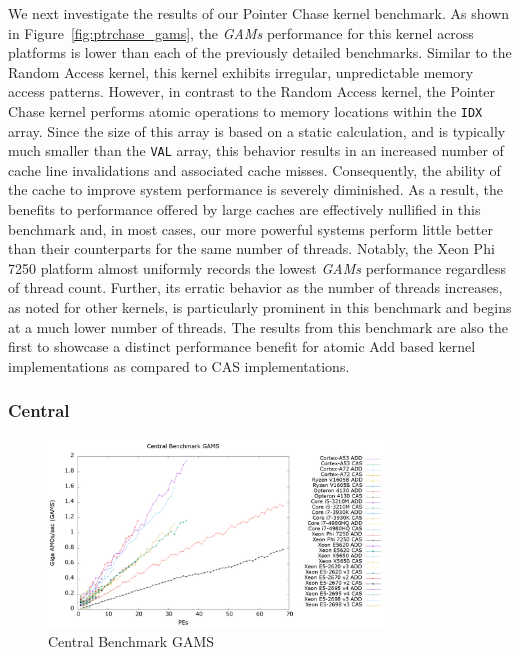 We next investigate the results of our Pointer Chase kernel benchmark.
As shown in Figure~\ref{fig:ptrchase_gams}, the \textit{GAMs} performance for this kernel across platforms is lower than each of the previously detailed benchmarks.
Similar to the Random Access kernel, this kernel exhibits irregular, unpredictable memory access patterns.
However, in contrast to the Random Access kernel, the Pointer Chase kernel performs atomic operations to memory locations within the \texttt{IDX} array.
Since the size of this array is based on a static calculation, and is typically much smaller than the \texttt{VAL} array, this behavior results in an increased number of cache line invalidations and associated cache misses. 
Consequently, the ability of the cache to improve system performance is severely diminished.
As a result, the benefits to performance offered by large caches are effectively nullified in this benchmark and, in most cases, our more powerful systems perform little better than their counterparts for the same number of threads.
Notably, the Xeon Phi 7250 platform almost uniformly records the lowest \textit{GAMs} performance regardless of thread count.
Further, its erratic behavior as the number of threads increases, as noted for other kernels, is particularly prominent in this benchmark and begins at a much lower number of threads.
The results from this benchmark are also the first to showcase a distinct performance benefit for atomic Add based kernel implementations as compared to CAS implementations.

\subsubsection{Central}
\label{subsubsec:central_res}

\begin{figure}[!t]
\centering
\includegraphics[width=3.5in]{figures/CENTRAL_GAMS.png}
\caption{Central Benchmark GAMS}
\label{fig:central_gams}
\end{figure}

